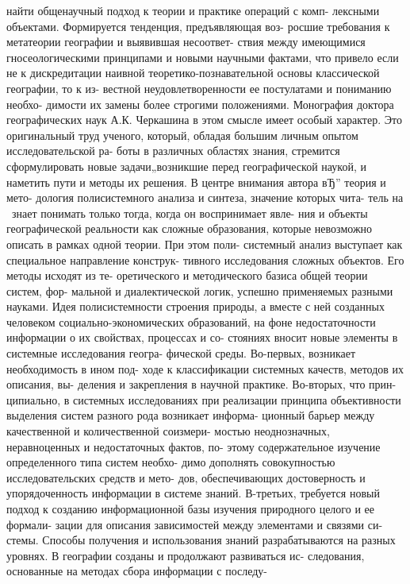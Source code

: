 \documentclass[12pt,draft,openany]{extbook}
\begin{document}
найти общенаучный подход к теории и практике операций с комп-
лексными объектами. Формируется тенденция, предъявляющая воз-
росшие требования к метатеории географии и выявившая несоответ-
ствия между имеющимися гносеологическими принципами и новыми
научными фактами, что привело если не к дискредитации наивной
теоретико-познавательной основы классической географии, то к из-
вестной неудовлетворенности ее постулатами и пониманию необхо-
димости их замены более строгими положениями.
Монография доктора географических наук А.К. Черкашина в
этом смысле имеет особый характер. Это оригинальный труд ученого,
который, обладая большим личным опытом исследовательской ра-
боты в различных областях знания, стремится сформулировать новые
задачи„возникшие перед географической наукой, и наметить пути
и методы их решения. В центре внимания автора вЂ” теория и мето-
дология полисистемного анализа и синтеза, значение которых чита-
тель на ~знает понимать только тогда, когда он воспринимает явле-
ния и объекты географической реальности как сложные образования,
которые невозможно описать в рамках одной теории. При этом поли-
системный анализ выступает как специальное направление конструк-
тивного исследования сложных объектов. Его методы исходят из те-
оретического и методического базиса общей теории систем, фор-
мальной и диалектической логик, успешно применяемых разными
науками. Идея полисистемности строения природы, а вместе с ней
созданных человеком социально-экономических образований, на
фоне недостаточности информации о их свойствах, процессах и со-
стояниях вносит новые элементы в системные исследования геогра-
фической среды. Во-первых, возникает необходимость в ином под-
ходе к классификации системных качеств, методов их описания, вы-
деления и закрепления в научной практике. Во-вторых, что прин-
ципиально, в системных исследованиях при реализации принципа
объективности выделения систем разного рода возникает информа-
ционный барьер между качественной и количественной соизмери-
мостью неоднозначных, неравноценных и недостаточных фактов, по-
этому содержательное изучение определенного типа систем необхо-
димо дополнять совокупностью исследовательских средств и мето-
дов, обеспечивающих достоверность и упорядоченность информации
в системе знаний. В-третьих, требуется новый подход к созданию
информационной базы изучения природного целого и ее формали-
зации для описания зависимостей между элементами и связями си-
стемы.
Способы получения и использования знаний разрабатываются на
разных уровнях. В географии созданы и продолжают развиваться ис-
следования, основанные на методах сбора информации с последу-
\end{document}

